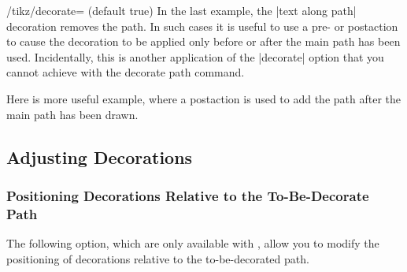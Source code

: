 \begin{key}{/tikz/decorate= (default true)}
    In the last example, the |text along path| decoration removes the path. In
    such cases it is useful to use a pre- or postaction to cause the decoration
    to be applied only before or after the main path has been used.
    Incidentally, this is another application of the |decorate| option that you
    cannot achieve with the decorate path command.
\begin{codeexample}[preamble={\usetikzlibrary{
    decorations.pathmorphing,
    decorations.text,
    shapes.geometric,
}}]
\end{codeexample}
    Here is more useful example, where a postaction is used to add the path
    after the main path has been drawn.
\begin{codeexample}[preamble={\usetikzlibrary{decorations.text}}]
\end{codeexample}
\end{key}


\subsection{Adjusting Decorations}
\label{section-decorations-adjust}

\subsubsection{Positioning Decorations Relative to the To-Be-Decorate Path}

The following option, which are only available with \tikzname, allow you to
modify the positioning of decorations relative to the to-be-decorated path.

